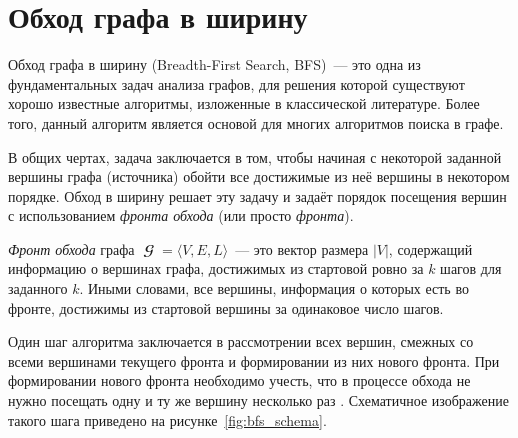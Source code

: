 \section{Обход графа в ширину}
\label{sec:BFS}

Обход графа в ширину (Breadth-First Search, BFS)~--- это одна из фундаментальных задач анализа графов, для решения которой существуют хорошо известные алгоритмы, изложенные в классической литературе.
Более того, данный алгоритм является основой для многих алгоритмов поиска в графе.

В общих чертах, задача заключается в том, чтобы начиная с некоторой заданной вершины графа (источника) обойти все достижимые из неё вершины в некотором порядке.
Обход в ширину решает эту задачу и задаёт порядок посещения вершин с использованием \emph{фронта обхода} (или просто \emph{фронта}).
\begin{definition}
    \emph{Фронт обхода} графа $\mbfscrG = \langle V, E, L \rangle$~--- это вектор размера $|V|$, содержащий информацию%
    о вершинах графа, достижимых из стартовой ровно за $k$ шагов для заданного $k$.
    Иными словами, все вершины, информация о которых есть во фронте, достижимы из стартовой вершины за одинаковое число шагов.
\end{definition}

Один шаг алгоритма заключается в рассмотрении всех вершин, смежных со всеми вершинами текущего фронта и формировании из них нового фронта.
При формировании нового фронта необходимо учесть, что в процессе обхода не нужно посещать одну и ту же вершину несколько раз%
.
Схематичное изображение такого шага приведено на рисунке~\ref{fig:bfs_schema}.
\begin{marginfigure}
    
    \caption{Схема одного шага обхода в ширину}
    \label{fig:bfs_schema}
\end{marginfigure}

